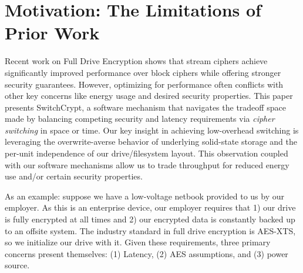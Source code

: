 



\title{\TITLE}

\date{}
\maketitle

\thispagestyle{empty}


\section{Motivation: The Limitations of Prior Work}
\label{sec:motivation}

Recent work on Full Drive Encryption shows that stream ciphers achieve
significantly improved performance over block ciphers while offering
stronger security guarantees. However, optimizing for performance
often conflicts with other key concerns like energy usage and desired
security properties.  This paper presents SwitchCrypt, a software mechanism that
navigates the tradeoff space made by balancing competing security and
latency requirements via \emph{cipher switching} in space or time. Our
key insight in achieving low-overhead switching is leveraging the
overwrite-averse behavior of underlying solid-state storage and the
per-unit independence of our drive/filesystem layout. This observation
coupled with our software mechanisms allow us to trade throughput for
reduced energy use and/or certain security properties.

As an example: suppose we have a low-voltage netbook provided to us by
our employer. As this is an enterprise device, our employer requires
that 1) our drive is fully encrypted at all times and 2) our encrypted
data is constantly backed up to an offsite system. The industry
standard in full drive encryption is AES-XTS, so we initialize our
drive with it. Given these requirements, three primary concerns
present themselves: (1) Latency, (2) AES assumptions, and (3) power
source.


